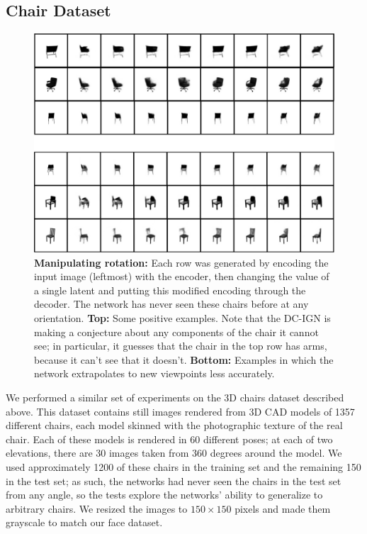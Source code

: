\documentclass[12pt,twoside]{mitthesis}
\begin{document}
\subsection{Chair Dataset}\label{chair-dataset}

\begin{figure}[htbp]
\centering
\includegraphics{../figures/chairs_combo.png}
\caption{\label{fig:chairpose}\textbf{Manipulating rotation:} Each row
was generated by encoding the input image (leftmost) with the encoder,
then changing the value of a single latent and putting this modified
encoding through the decoder. The network has never seen these chairs
before at any orientation. \textbf{Top:} Some positive examples. Note
that the DC-IGN is making a conjecture about any components of the chair
it cannot see; in particular, it guesses that the chair in the top row
has arms, because it can't see that it doesn't. \textbf{Bottom:}
Examples in which the network extrapolates to new viewpoints less
accurately.}
\end{figure}

We performed a similar set of experiments on the 3D chairs dataset
described above. This dataset contains still images rendered from 3D CAD
models of 1357 different chairs, each model skinned with the
photographic texture of the real chair. Each of these models is rendered
in 60 different poses; at each of two elevations, there are 30 images
taken from 360 degrees around the model. We used approximately 1200 of
these chairs in the training set and the remaining 150 in the test set;
as such, the networks had never seen the chairs in the test set from any
angle, so the tests explore the networks' ability to generalize to
arbitrary chairs. We resized the images to \(150 \times 150\) pixels and
made them grayscale to match our face dataset.
\end{document}
